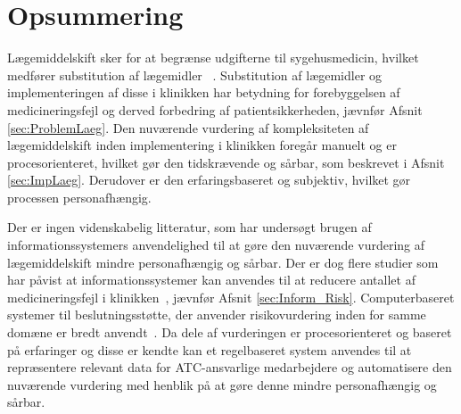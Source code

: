 
\section{Opsummering}
Lægemiddelskift sker for at begrænse udgifterne til sygehusmedicin, hvilket medfører substitution af lægemidler ~\citep{Ess2003, Johnston2011}. Substitution af lægemidler og implementeringen af disse i klinikken har betydning for forebyggelsen af medicineringsfejl og derved forbedring af patientsikkerheden, jævnfør Afsnit \ref{sec:ProblemLaeg}. Den nuværende vurdering af kompleksiteten af lægemiddelskift inden implementering i klinikken foregår manuelt og er procesorienteret, hvilket gør den tidskrævende og sårbar, som beskrevet i Afsnit \ref{sec:ImpLaeg}. Derudover er den erfaringsbaseret og subjektiv, hvilket gør processen personafhængig.

Der er ingen videnskabelig litteratur, som har undersøgt brugen af informationssystemers anvendelighed til at gøre den nuværende vurdering af lægemiddelskift mindre personafhængig og sårbar. Der er dog flere studier som har påvist at informationssystemer kan anvendes til at reducere antallet af medicineringsfejl i klinikken~\citep{Agrawal2009, Stenner2010, Fischer2008, Simpson2008}, jævnfør Afsnit \ref{sec:Inform_Risk}. Computerbaseret systemer til beslutningsstøtte, der anvender risikovurdering inden for samme domæne er bredt anvendt~\citep{Geissert2018, Rawshani2018}. Da dele af vurderingen er procesorienteret og baseret på erfaringer og disse er kendte kan et regelbaseret system anvendes til at repræsentere relevant data for ATC-ansvarlige medarbejdere og automatisere den nuværende vurdering med henblik på at gøre denne mindre personafhængig og sårbar. 



